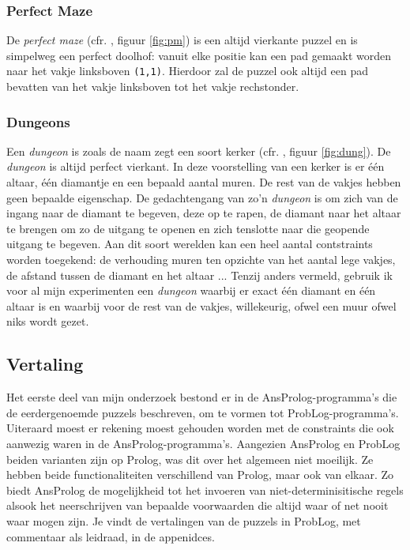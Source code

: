 \documentclass{article}
\begin{document}
	\subsubsection*{Perfect Maze}
	De \textit{perfect maze} (cfr. \cite{togelius2015chapter8}, figuur \ref{fig:pm}) is een altijd vierkante puzzel en is simpelweg een perfect doolhof: vanuit elke positie kan een pad gemaakt worden naar het vakje linksboven \texttt{(1,1)}. Hierdoor zal de puzzel ook altijd een pad bevatten van het vakje linksboven tot het vakje rechstonder.
	
		\subsubsection*{Dungeons}
	Een \textit{dungeon} is zoals de naam zegt een soort kerker (cfr. \cite{togelius2015chapter8}, figuur \ref{fig:dung}). De \textit{dungeon} is altijd perfect vierkant. In deze voorstelling van een kerker is er \'e\'en altaar, \'e\'en diamantje en een bepaald aantal muren. De rest van de vakjes hebben geen bepaalde eigenschap. De gedachtengang van zo'n \textit{dungeon} is om zich van de ingang naar de diamant te begeven, deze op te rapen, de diamant naar het altaar te brengen om zo de uitgang te openen en zich tenslotte naar die geopende uitgang te begeven. Aan dit soort werelden kan een heel aantal contstraints worden toegekend: de verhouding muren ten opzichte van het aantal lege vakjes, de afstand tussen de diamant en het altaar ... Tenzij anders vermeld, gebruik ik voor al mijn experimenten een \textit{dungeon} waarbij er exact \'e\'en diamant en \'e\'en altaar is en waarbij voor de rest van de vakjes, willekeurig, ofwel een muur ofwel niks wordt gezet.
			
	\subsection{Vertaling}
	Het eerste deel van mijn onderzoek bestond er in de AnsProlog-programma's die de eerdergenoemde puzzels beschreven, om te vormen tot ProbLog-programma's. Uiteraard moest er rekening moest gehouden worden met de constraints die ook aanwezig waren in de AnsProlog-programma's. Aangezien AnsProlog en ProbLog beiden varianten zijn op Prolog, was dit over het algemeen niet moeilijk. Ze hebben beide functionaliteiten verschillend van Prolog, maar ook van elkaar. Zo biedt AnsProlog de mogelijkheid tot het invoeren van niet-determinisitische regels alsook het neerschrijven van bepaalde voorwaarden die altijd waar of net nooit waar mogen zijn. Je vindt de vertalingen van de puzzels in ProbLog, met commentaar als leidraad, in de appenidces.
	
\end{document}
